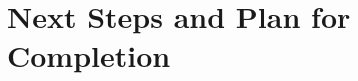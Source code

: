\documentclass[conference]{IEEEtran}
\begin{document}

\section{Next Steps and Plan for Completion}




\end{document}

